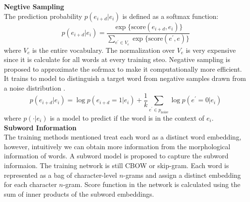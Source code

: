 \textbf{Negtive Sampling}\\
The prediction probability $p(e_{i+d}|e_i)$ is defined as a softmax function:
\[p(e_{i+d}|e_i) = \frac{\exp \{ \text{score}(e_{i+d},e_i)\} }{\sum_{e^{\prime} \in V_e}{\exp  \{ \text{score}(e^{\prime}, e) \}}}\]
where $V_e$ is the entire vocabulary. 
The normalization over $V_e$ is very expensive since it is calculate for all words at every training steo. Negative sampling is proposed to approximate the sofrmax to make it computationally more efficient. It trains to model to distinguish a target word from negative samples drawn from a noise distribution .
\[p(e_{i+d}|e_i) = \log p(e_{i+d}=1| e_i) + \frac{1}{k} \sum_{e^{\prime} \in p_{\text{noise}}}\log p(e^{\prime}=0|e_i)\]
where $p(\cdot| e_i)$ is a model to predict if the word is in the context of $e_i$.\\ 
\textbf{Subword Information}\\
The training methods mentioned treat each word as a distinct word embedding, however, intuitively we can obtain more information from the morphological information of words. A subword model is proposed to capture the subword informaion. The training network is still CBOW or skip-gram. Each word is represented as a bag of character-level $n$-grams and assign a distinct embedding for each character $n$-gram. Score function in the network is calculated using the sum of inner products of the subword embeddings. 
